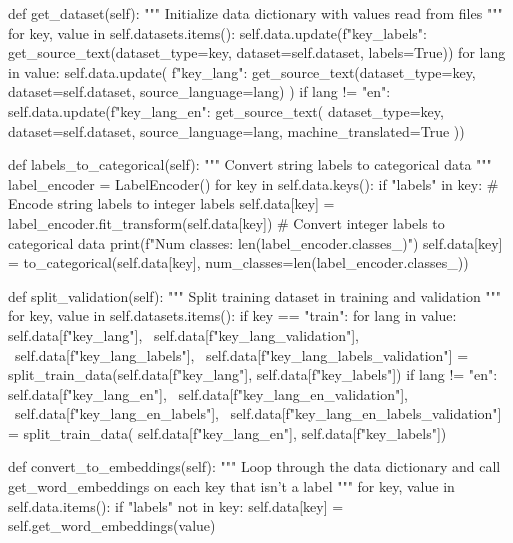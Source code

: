 \begin{python}
    def get_dataset(self):
        """ Initialize data dictionary with values read from files
        """
        for key, value in self.datasets.items():
            self.data.update({f"{key}_labels": get_source_text(dataset_type=key, dataset=self.dataset, labels=True)})
            for lang in value:
                self.data.update(
                    {f"{key}_{lang}": get_source_text(dataset_type=key, dataset=self.dataset, source_language=lang)}
                )
                if lang != "en":
                    self.data.update({f"{key}_{lang}_en": get_source_text(
                        dataset_type=key,
                        dataset=self.dataset,
                        source_language=lang,
                        machine_translated=True
                    )})

    def labels_to_categorical(self):
        """ Convert string labels to categorical data
        """
        label_encoder = LabelEncoder()
        for key in self.data.keys():
            if "labels" in key:
                # Encode string labels to integer labels
                self.data[key] = label_encoder.fit_transform(self.data[key])
                # Convert integer labels to categorical data
                print(f"Num classes: {len(label_encoder.classes_)}")
                self.data[key] = to_categorical(self.data[key], num_classes=len(label_encoder.classes_))

    def split_validation(self):
        """ Split training dataset in training and validation
        """
        for key, value in self.datasets.items():
            if key == "train":
                for lang in value:
                    self.data[f"{key}_{lang}"], \
                        self.data[f"{key}_{lang}_validation"], \
                        self.data[f"{key}_{lang}_labels"], \
                        self.data[f"{key}_{lang}_labels_validation"] = split_train_data(self.data[f"{key}_{lang}"],
                                                                                        self.data[f"{key}_labels"])
                    if lang != "en":
                        self.data[f"{key}_{lang}_en"], \
                            self.data[f"{key}_{lang}_en_validation"], \
                            self.data[f"{key}_{lang}_en_labels"], \
                            self.data[f"{key}_{lang}_en_labels_validation"] = split_train_data(
                            self.data[f"{key}_{lang}_en"],
                            self.data[f"{key}_labels"])

    def convert_to_embeddings(self):
        """ Loop through the data dictionary and call get_word_embeddings on each key that isn't a label
        """
        for key, value in self.data.items():
            if "labels" not in key:
                self.data[key] = self.get_word_embeddings(value)


\end{python}
